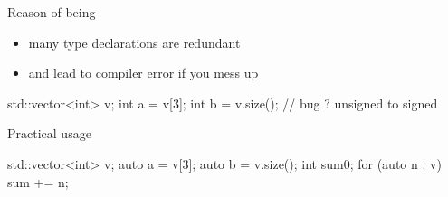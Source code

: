\begin{frame}[fragile]
  \begin{block}{Reason of being}
    \begin{itemize}
    \item many type declarations are redundant
    \item and lead to compiler error if you mess up
    \end{itemize}
    \begin{cppcode*}{}
      std::vector<int> v;
      int a = v[3];
      int b = v.size();  // bug ? unsigned to signed
    \end{cppcode*}
  \end{block}
  \pause
  \begin{block}{Practical usage}
    \begin{cppcode*}{}
      std::vector<int> v;
      auto a = v[3];
      auto b = v.size();
      int sum{0};
      for (auto n : v) { sum += n; }
    \end{cppcode*}
  \end{block}
\end{frame}

